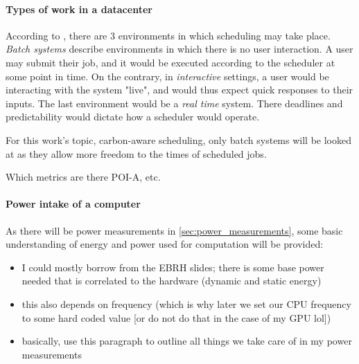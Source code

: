 \paragraph{Types of work in a datacenter} According to \cite{tanenbaum_operating_2006}, there are 3 environments in which scheduling may take place. \emph{Batch systems} describe environments in which there is no user interaction.
A user may submit their job, and it would be executed according to the scheduler at some point in time. 
On the contrary, in \emph{interactive} settings, a user would be interacting with the system "live", and would thus expect quick responses to their inputs. 
The last environment would be a \emph{real time} system. There deadlines and predictability would dictate how a scheduler would operate.

For this work's topic, carbon-aware scheduling, only batch systems will be looked at as they allow more freedom to the times of scheduled jobs. 


Which metrics are there POI-A, etc.

\paragraph{Power intake of a computer}
As there will be power measurements in \ref{sec:power_measurements}, some basic understanding of energy and power used for computation will be provided:
\begin{itemize}
    \item I could mostly borrow from the EBRH slides; there is some base power needed that is correlated to the hardware (dynamic and static energy)
    \item this also depends on frequency (which is why later we set our CPU frequency to some hard coded value [or do not do that in the case of my GPU lol])
    \item basically, use this paragraph to outline all things we take care of in my power measurements
\end{itemize}